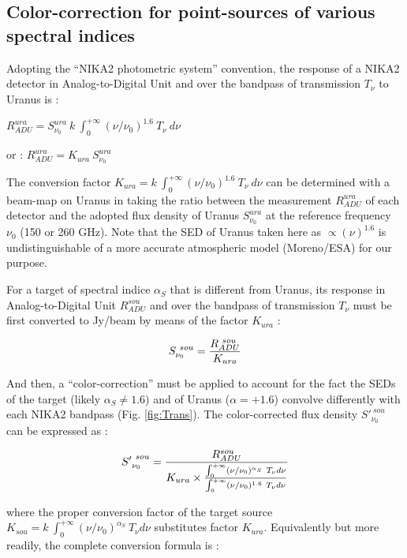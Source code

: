 
\subsection{Color-correction for point-sources of various spectral indices}
\label{ap:color_correction_JFL}

Adopting  the ``NIKA2 photometric system'' convention, the response of a NIKA2 detector in Analog-to-Digital Unit and over the bandpass 
of transmission $T_{\nu}$ to Uranus is :

$R_{ADU}^{ura} =  S_{\nu_0}^{ura}~ k~\int_{0}^{+\infty} (\nu /\nu_0)^{1.6} ~ T_{\nu} ~ d\nu  $

\null

\noindent or : $ R_{ADU}^{ura} = K_{ura}  ~ S_{\nu_0}^{ura} $

\null

\noindent The conversion factor   $K_{ura}  = k ~
\int_{0}^{+\infty} (\nu /\nu_0)^{1.6} ~ T_{\nu} ~ d\nu $ can be
determined with a beam-map on Uranus in taking the ratio between the measurement $R_{ADU}^{ura}$ of each detector and 
the adopted flux density of Uranus $S_{\nu_0}^{ura}$ at the reference frequency $\nu_0$ (150 or 260 GHz).
Note that the SED of Uranus taken here as $\propto (\nu)^{1.6}$  is undistinguishable of a more
accurate atmospheric model  (Moreno/ESA) for our purpose.


For a target of spectral indice  $\alpha_{S}$ that is different from Uranus,  
its  response in Analog-to-Digital Unit $R_{ADU}^{sou}$    and over the bandpass
of transmission $T_{\nu}$ must be first converted to Jy/beam by means of the factor $K_{ura}$ :

$$ S_{\nu_0}^{~sou} =  {R_{ADU}^{~ sou} \over K_{ura}} $$

\noindent And then, a ``color-correction'' must be applied to account for the fact the SEDs of the target (likely $\alpha_{S} \ne 1.6$) 
and of Uranus ($\alpha=+1.6$) convolve differently with
each NIKA2 bandpass (Fig. \ref{fig:Trans}). The color-corrected flux density ${S'}_{\nu_0}^{~sou}$ can be expressed as :

$$ {S'}_{\nu_0}^{~sou} =  {R_{ADU}^{sou} \over { K_{ura} \times {{{\int_{0}^{+\infty} (\nu /\nu_0)^{\alpha_{S}} ~ T_{\nu} d\nu }  } \over { \int_{0}^{+\infty} (\nu /\nu_0)^{1.6} ~ T_{\nu} d\nu  }}}}  $$


\noindent where the proper conversion factor of the target source 
$K_{sou}=k ~ \int_{0}^{+\infty} (\nu /\nu_0)^{\alpha_S} ~ T_{\nu} d\nu $ substitutes factor $K_{ura}$.  Equivalently but more readily, the complete conversion formula is  :

